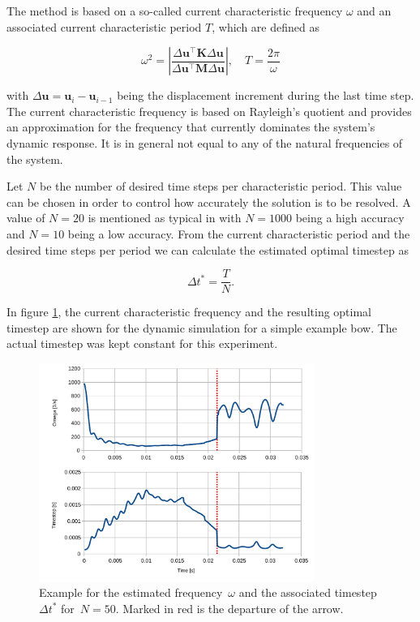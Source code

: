 The method is based on a so-called current characteristic frequency $\omega$ and an associated current characteristic period $T$, which are defined as

\begin{equation}
\omega^2 = \left\vert \frac{\Delta \boldsymbol{u}^\intercal \boldsymbol{K} \Delta \boldsymbol{u}}{\Delta \boldsymbol{u}^\intercal   \boldsymbol{M} \Delta \boldsymbol{u}} \right\vert, \quad T = \frac{2\pi}{\omega}
\end{equation}

with $\Delta \boldsymbol{u} = \boldsymbol{u}_{i} - \boldsymbol{u}_{i-1}$ being the displacement increment during the last time step.
The current characteristic frequency is based on Rayleigh's quotient and provides an approximation for the frequency that currently dominates the system's dynamic response.
It is in general not equal to any of the natural frequencies of the system.

Let $N$ be the number of desired time steps per characteristic period.
This value can be chosen in order to control how accurately the solution is to be resolved.
A value of $N = 20$ is mentioned as typical in \cite{bib:rossi2014} with $N = 1000$ being a high accuracy and $N = 10$ being a low accuracy.
From the current characteristic period and the desired time steps per period we can calculate the estimated optimal timestep as

\begin{equation}
\Delta t^* = \frac{T}{N}.
\end{equation}

In figure \ref{fig:adaptive-timestep}, the current characteristic frequency and the resulting optimal timestep are shown for the dynamic simulation for a simple example bow.
The actual timestep was kept constant for this experiment.

\begin{figure}[h]
\centering
\includegraphics[width=0.8\textwidth]{figures/solution/adaptive-timestep}
\caption{Example for the estimated frequency~$\omega$ and the associated timestep~$\Delta t^*$ for~$N = 50$. Marked in red is the departure of the arrow.}
\label{fig:adaptive-timestep}
\end{figure}

